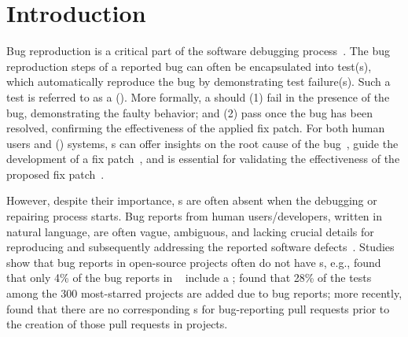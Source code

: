 \section{Introduction}
\label{sec:intro}
Bug reproduction is a critical part of the software debugging process~\cite{chaparro2019assessing,kang2023large,koyuncu2019ifixr,Ernst2014Defects4J,le2012systematic,xiong2017precise,li2019deepfl,yang2024swe}.
The bug reproduction steps of a reported bug can often be encapsulated into test(s), which automatically reproduce the bug by demonstrating test failure(s).
Such a test is referred to as a \brtfull (\brt).
More formally, a \brt{} should (1) fail in the presence of the bug, demonstrating the faulty behavior; and (2) pass once the bug has been resolved, confirming the effectiveness of the applied fix patch.
For both human users and \autoprfull (\autopr) systems, \brt{}s can offer insights on the root cause of the bug~\cite{ko2008debugging,kang2023large,nayrolles2015jcharming,just2018comparing}, guide the development of a fix patch~\cite{rondon2025passerine,yang2024swe,mundler2024swt}, and is essential for validating the effectiveness of the proposed fix patch~\cite{ko2008debugging,Ernst2014Defects4J,saha2017elixir,le2012systematic}.



However, despite their importance, \brt{}s are often absent when the debugging or repairing process starts.
Bug reports from human users/developers, written in natural language, are often vague, ambiguous, and lacking crucial details for reproducing and subsequently addressing the reported software defects~\cite{bettenburg2008duplicate,zimmermann2009cross,anvik2006should}.
Studies show that bug reports in open-source projects often do not have \brt{}s, e.g., \citet{koyuncu2019ifixr} found that only 4\% of the bug reports in ~\cite{Ernst2014Defects4J} include a \brt; \citet{kang2023large} found that 28\% of the tests among the 300 most-starred \github projects are added due to bug reports;
more recently, \citet{mundler2024swt} found that there are no corresponding \brt{}s for bug-reporting pull requests prior to the creation of those pull requests in \swebench projects.


